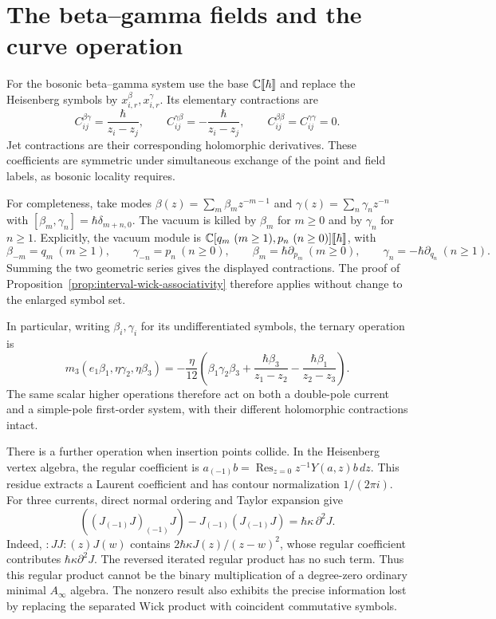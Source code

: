 \section{The beta--gamma fields and the curve operation}

For the bosonic beta--gamma system use the base $\mathbb C\llbracket\hbar\rrbracket$
and replace the Heisenberg symbols by
$x_{i,r}^{\beta},x_{i,r}^{\gamma}$.  Its elementary contractions are
\[
 C_{ij}^{\beta\gamma}=\frac{\hbar}{z_i-z_j},\qquad
 C_{ij}^{\gamma\beta}=-\frac{\hbar}{z_i-z_j},\qquad
 C_{ij}^{\beta\beta}=C_{ij}^{\gamma\gamma}=0.
\]
Jet contractions are their corresponding holomorphic derivatives.
These coefficients are symmetric under simultaneous exchange of the
point and field labels, as bosonic locality requires.

For completeness, take modes
$\beta(z)=\sum_m\beta_mz^{-m-1}$ and
$\gamma(z)=\sum_n\gamma_nz^{-n}$ with
$[\beta_m,\gamma_n]=\hbar\delta_{m+n,0}$.
The vacuum is killed by $\beta_m$ for $m\ge0$ and by $\gamma_n$
for $n\ge1$.  Explicitly, the vacuum module is
$\C[q_m\ (m\ge1),p_n\ (n\ge0)]\llbracket\hbar\rrbracket$, with
\[
 \beta_{-m}=q_m\ (m\ge1),\qquad
 \gamma_{-n}=p_n\ (n\ge0),\qquad
 \beta_m=\hbar\partial_{p_m}\ (m\ge0),\qquad
 \gamma_n=-\hbar\partial_{q_n}\ (n\ge1).
\]
Summing the two geometric series gives the displayed contractions.
The proof of Proposition~\ref{prop:interval-wick-associativity}
therefore applies without change to the enlarged symbol set.

In particular, writing $\beta_i,\gamma_i$ for its undifferentiated
symbols, the ternary operation is
\[
 m_3(e_1\beta_1,\eta\gamma_2,\eta\beta_3)
 =-\frac{\eta}{12}\left(
 \beta_1\gamma_2\beta_3+
 \frac{\hbar\beta_3}{z_1-z_2}
 -\frac{\hbar\beta_1}{z_2-z_3}\right).
\]
The same scalar higher operations therefore act on both a double-pole
current and a simple-pole first-order system, with their different
holomorphic contractions intact.

There is a further operation when insertion points collide.  In the
Heisenberg vertex algebra, the regular coefficient is
$a_{(-1)}b=\operatorname{Res}_{z=0}z^{-1}Y(a,z)b\,dz$.
This residue extracts a Laurent coefficient and has contour
normalization $1/(2\pi i)$.  For three currents, direct normal ordering
and Taylor expansion give
\[
 ((J_{(-1)}J)_{(-1)}J)-J_{(-1)}(J_{(-1)}J)
 =\hbar\kappa\,\partial^2J.
\]
Indeed, $:JJ:(z)J(w)$ contains
$2\hbar\kappa J(z)/(z-w)^2$, whose regular coefficient contributes
$\hbar\kappa\partial^2J$.  The reversed iterated regular product
has no such term.  Thus this regular product cannot be the binary
multiplication of a degree-zero ordinary minimal $A_\infty$ algebra.
The nonzero result also exhibits the precise information lost by
replacing the separated Wick product with coincident commutative symbols.

